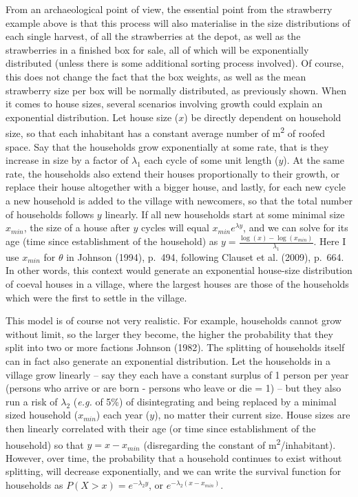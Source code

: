 \documentclass[
  12pt,
]{book}
\begin{document}
From an archaeological point of view, the essential point from the strawberry example above is that this process will also materialise in the size distributions of each single harvest, of all the strawberries at the depot, as well as the strawberries in a finished box for sale, all of which will be exponentially distributed (unless there is some additional sorting process involved). Of course, this does not change the fact that the box weights, as well as the mean strawberry size per box will be normally distributed, as previously shown. When it comes to house sizes, several scenarios involving growth could explain an exponential distribution. Let house size (\(x\)) be directly dependent on household size, so that each inhabitant has a constant average number of m\textsuperscript{2} of roofed space. Say that the households grow exponentially at some rate, that is they increase in size by a factor of \(\lambda_1\) each cycle of some unit length (\(y\)). At the same rate, the households also extend their houses proportionally to their growth, or replace their house altogether with a bigger house, and lastly, for each new cycle a new household is added to the village with newcomers, so that the total number of households follows \(y\) linearly. If all new households start at some minimal size \(x_{min}\), the size of a house after \(y\) cycles will equal \(x_{min}e^{\lambda y}\), and we can solve for its age (time since establishment of the household) as \(y = \frac{\log(x)-\log(x_{min})}{\lambda_1}\). Here I use \(x_{min}\) for \(\theta\) in Johnson (1994), p.~494, following Clauset et al. (2009), p.~664. In other words, this context would generate an exponential house-size distribution of coeval houses in a village, where the largest houses are those of the households which were the first to settle in the village.

This model is of course not very realistic. For example, households cannot grow without limit, so the larger they become, the higher the probability that they split into two or more factions Johnson (1982). The splitting of households itself can in fact also generate an exponential distribution. Let the households in a village grow linearly -- say they each have a constant surplus of 1 person per year (persons who arrive or are born - persons who leave or die = 1) -- but they also run a risk of \(\lambda_2\) (\emph{e.g.} of 5\%) of disintegrating and being replaced by a minimal sized household (\(x_{min}\)) each year (\(y\)), no matter their current size. House sizes are then linearly correlated with their age (or time since establishment of the household) so that \(y = x - x_{min}\) (disregarding the constant of m\textsuperscript{2}/inhabitant). However, over time, the probability that a household continues to exist without splitting, will decrease exponentially, and we can write the survival function for households as \(P(X > x) = e^{-\lambda_2 y}\), or \(e^{-\lambda_2 (x-x_{min})}\).
\end{document}
